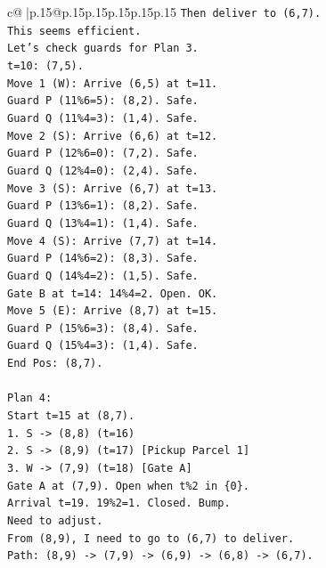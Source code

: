\documentclass{article}
\begin{document}
{\begin{supertabular}{c@{$\;$}|p{.15\linewidth}@{}p{.15\linewidth}p{.15\linewidth}p{.15\linewidth}p{.15\linewidth}p{.15\linewidth}}
{{{\texttt{Then deliver to (6,7).} \\
\texttt{This seems efficient.} \\
\texttt{Let's check guards for Plan 3.} \\
\texttt{t=10: (7,5).} \\
\texttt{Move 1 (W): Arrive (6,5) at t=11.} \\
\texttt{Guard P (11\%6=5): (8,2). Safe.} \\
\texttt{Guard Q (11\%4=3): (1,4). Safe.} \\
\texttt{Move 2 (S): Arrive (6,6) at t=12.} \\
\texttt{Guard P (12\%6=0): (7,2). Safe.} \\
\texttt{Guard Q (12\%4=0): (2,4). Safe.} \\
\texttt{Move 3 (S): Arrive (6,7) at t=13.} \\
\texttt{Guard P (13\%6=1): (8,2). Safe.} \\
\texttt{Guard Q (13\%4=1): (1,4). Safe.} \\
\texttt{Move 4 (S): Arrive (7,7) at t=14.} \\
\texttt{Guard P (14\%6=2): (8,3). Safe.} \\
\texttt{Guard Q (14\%4=2): (1,5). Safe.} \\
\texttt{Gate B at t=14: 14\%4=2. Open. OK.} \\
\texttt{Move 5 (E): Arrive (8,7) at t=15.} \\
\texttt{Guard P (15\%6=3): (8,4). Safe.} \\
\texttt{Guard Q (15\%4=3): (1,4). Safe.} \\
\texttt{End Pos: (8,7).} \\
\\ 
\texttt{Plan 4:} \\
\texttt{Start t=15 at (8,7).} \\
\texttt{1. S {-}> (8,8) (t=16)} \\
\texttt{2. S {-}> (8,9) (t=17) {[}Pickup Parcel 1{]}} \\
\texttt{3. W {-}> (7,9) (t=18) {[}Gate A{]}} \\
\texttt{Gate A at (7,9). Open when t\%2 in \{0\}.} \\
\texttt{Arrival t=19. 19\%2=1. Closed. Bump.} \\
\texttt{Need to adjust.} \\
\texttt{From (8,9), I need to go to (6,7) to deliver.} \\
\texttt{Path: (8,9) {-}> (7,9) {-}> (6,9) {-}> (6,8) {-}> (6,7).} \\
}}}
\end{supertabular}}
\end{document}
